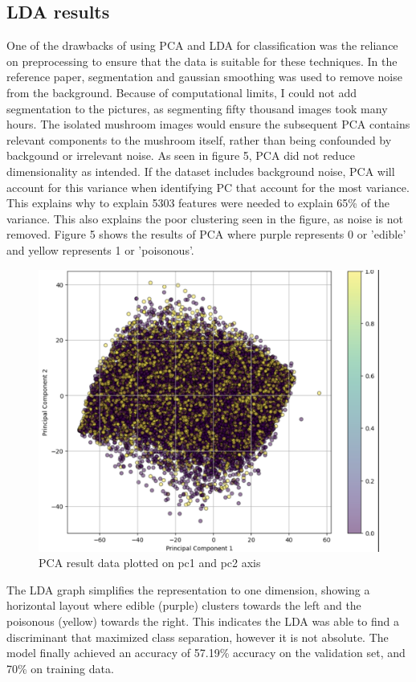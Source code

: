 \documentclass[journal]{IEEEtran}
\begin{document}
\subsection{LDA results}
One of the drawbacks of using PCA and LDA for classification was the reliance on preprocessing to ensure that the data is suitable for these techniques. In the reference paper, segmentation and gaussian smoothing was used to remove noise from the background. Because of computational limits, I could not add segmentation to the pictures, as segmenting fifty thousand images took many hours. The isolated mushroom images would ensure the subsequent PCA contains relevant components to the mushroom itself, rather than being confounded by backgound or irrelevant noise. As seen in figure 5, PCA did not reduce dimensionality as intended. If the dataset includes background noise, PCA will account for this variance when identifying PC that account for the most variance. This explains why to explain 5303 features were needed to explain 65\% of the variance. This also explains the poor clustering seen in the figure, as noise is not removed. Figure 5 shows the results of PCA where purple represents 0 or 'edible' and yellow represents 1 or 'poisonous'.
\begin{figure}[H]
    \includegraphics[width=\linewidth]{imgs/pcaplot.png}
    \caption{PCA result data plotted on pc1 and pc2 axis}
\end{figure}
The LDA graph simplifies the representation to one dimension, showing a horizontal layout where edible (purple) clusters towards the left and the poisonous (yellow) towards the right. This indicates the LDA was able to find a discriminant that maximized class separation, however it is not absolute. The model finally achieved an accuracy of 57.19\% accuracy on the validation set, and 70\% on training data. 
\end{document}
